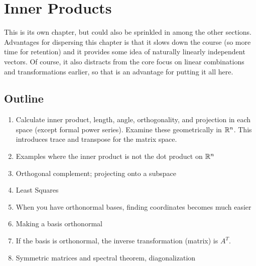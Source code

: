 \chapter{Inner Products}

This is its own chapter, but could also be sprinkled in among the
other sections.  Advantages for dispersing this chapter is that it
slows down the course (so more time for retention) and it provides
some idea of naturally linearly independent vectors.  Of course, it
also distracts from the core focus on linear combinations and
transformations earlier, so that is an advantage for putting it all
here.

\section{Outline}
\begin{enumerate}
  \item Calculate inner product, length, angle, orthogonality, and
    projection in each space (except formal power series).  Examine
    these geometrically in $\mathbb{R}^n$.  This introduces trace and
    transpose for the matrix space.
\item Examples where the inner product is not the dot product on $\mathbb{R}^n$
\item Orthogonal complement; projecting onto a subspace
\item Least Squares
  \item When you have orthonormal bases, finding coordinates becomes
    much easier
  \item Making a basis orthonormal
  \item If the basis is orthonormal, the inverse transformation (matrix)
    is $A^T$.
\item Symmetric matrices and spectral theorem, diagonalization

\end{enumerate}

